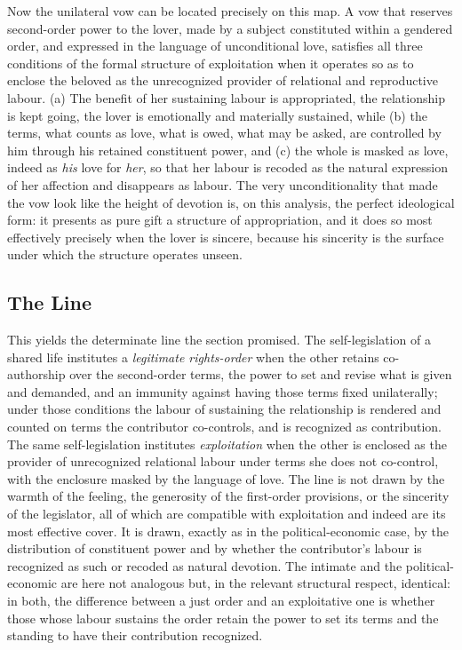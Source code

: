 Now the unilateral vow can be located precisely on this map. A vow that reserves second-order power to the lover, made by a subject constituted within a gendered order, and expressed in the language of unconditional love, satisfies all three conditions of the formal structure of exploitation when it operates so as to enclose the beloved as the unrecognized provider of relational and reproductive labour. (a) The benefit of her sustaining labour is appropriated, the relationship is kept going, the lover is emotionally and materially sustained, while (b) the terms, what counts as love, what is owed, what may be asked, are controlled by him through his retained constituent power, and (c) the whole is masked as love, indeed as \emph{his} love for \emph{her}, so that her labour is recoded as the natural expression of her affection and disappears as labour. The very unconditionality that made the vow look like the height of devotion is, on this analysis, the perfect ideological form: it presents as pure gift a structure of appropriation, and it does so most effectively precisely when the lover is sincere, because his sincerity is the surface under which the structure operates unseen.

\subsection{The Line}

This yields the determinate line the section promised. The self-legislation of a shared life institutes a \emph{legitimate rights-order} when the other retains co-authorship over the second-order terms, the power to set and revise what is given and demanded, and an immunity against having those terms fixed unilaterally; under those conditions the labour of sustaining the relationship is rendered and counted on terms the contributor co-controls, and is recognized as contribution. The same self-legislation institutes \emph{exploitation} when the other is enclosed as the provider of unrecognized relational labour under terms she does not co-control, with the enclosure masked by the language of love. The line is not drawn by the warmth of the feeling, the generosity of the first-order provisions, or the sincerity of the legislator, all of which are compatible with exploitation and indeed are its most effective cover. It is drawn, exactly as in the political-economic case, by the distribution of constituent power and by whether the contributor's labour is recognized as such or recoded as natural devotion. The intimate and the political-economic are here not analogous but, in the relevant structural respect, identical: in both, the difference between a just order and an exploitative one is whether those whose labour sustains the order retain the power to set its terms and the standing to have their contribution recognized.

